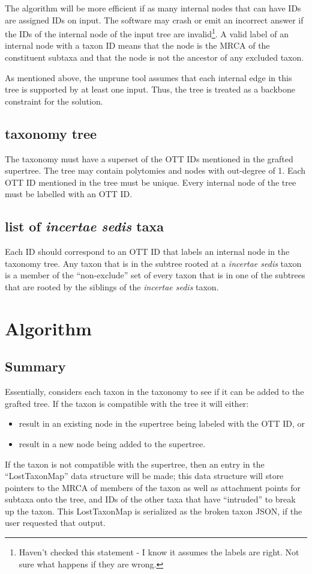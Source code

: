 \documentclass[english]{article}
\newcommand{\incsed}[0]{{\em incertae sedis}\xspace}
\begin{document}
The algorithm will be more efficient if as many internal nodes that can have IDs are 
    assigned IDs on input.
The software may crash or emit an incorrect answer if the IDs of the internal node
    of the input tree are invalid\footnote{Haven't checked this statement - I know it assumes the labels are right. Not sure what happens if they are wrong.}. 
A valid label of an internal node with a taxon ID means that the node is the MRCA
    of the constituent subtaxa and that the node is not the ancestor of any
    excluded taxon.

As mentioned above, the unprune tool assumes that each internal edge in this tree
    is supported by at least one input.
Thus, the tree is treated as a backbone constraint for the solution.

\subsection{taxonomy tree}
The taxonomy must have a superset of the OTT IDs mentioned in the grafted supertree.
The tree may contain polytomies and nodes with out-degree of 1.
Each OTT ID mentioned in the tree must be unique.
Every internal node of the tree must be labelled with an OTT ID.

\subsection{list of \incsed taxa}
Each ID should correspond to an OTT ID that labels an internal node in the taxonomy tree.
Any taxon that is in the subtree rooted at a \incsed taxon is
    a member of the ``non-exclude'' set of every taxon that is in one
    of the subtrees that are rooted by the siblings of the \incsed taxon.

\section{Algorithm}
\subsection{Summary}
Essentially, considers each taxon in the taxonomy to see if it can be added to the grafted tree.
If the taxon is compatible with the tree it will either:
\begin{itemize}
    \item result in an existing node in the supertree being labeled with the OTT ID, or
    \item result in a new node being added to the supertree.
\end{itemize}
If the taxon is not compatible with the supertree, then an entry in the ``LostTaxonMap'' data
    structure will be made; this data structure will store pointers to the
    MRCA of members of the taxon as well as attachment points for subtaxa onto the tree, and
    IDs of the other taxa that have ``intruded'' to break up the taxon.
This LostTaxonMap is serialized as the broken taxon JSON, if the user requested that output.
\end{document}
